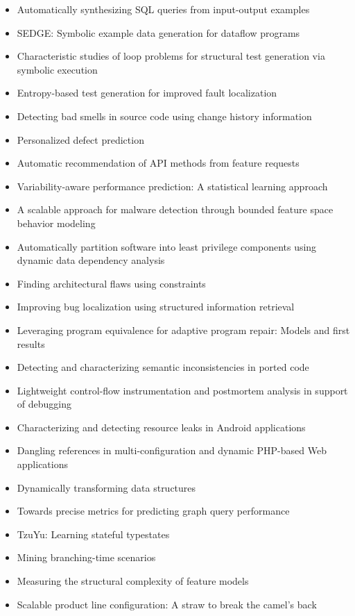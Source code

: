{\begin{itemize}[itemsep=-1ex]
  \item Automatically synthesizing SQL queries from input-output examples
  \item SEDGE: Symbolic example data generation for dataflow programs
  \item Characteristic studies of loop problems for structural test generation via symbolic execution
  \item Entropy-based test generation for improved fault localization
  \item Detecting bad smells in source code using change history information
  \item Personalized defect prediction
  \item Automatic recommendation of API methods from feature requests
  \item Variability-aware performance prediction: A statistical learning approach
  \item A scalable approach for malware detection through bounded feature space behavior modeling
  \item Automatically partition software into least privilege components using dynamic data dependency analysis
  \item Finding architectural flaws using constraints
  \item Improving bug localization using structured information retrieval
  \item Leveraging program equivalence for adaptive program repair: Models and first results
  \item Detecting and characterizing semantic inconsistencies in ported code
  \item Lightweight control-flow instrumentation and postmortem analysis in support of debugging
  \item Characterizing and detecting resource leaks in Android applications
  \item Dangling references in multi-configuration and dynamic PHP-based Web applications
  \item Dynamically transforming data structures
  \item Towards precise metrics for predicting graph query performance
  \item TzuYu: Learning stateful typestates
  \item Mining branching-time scenarios
  \item Measuring the structural complexity of feature models
  \item Scalable product line configuration: A straw to break the camel's back

\end{itemize}}
